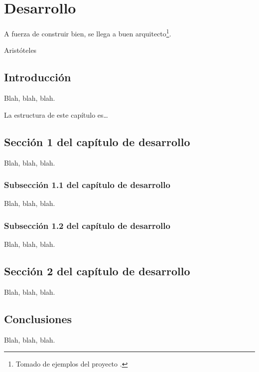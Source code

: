 
\chapter{Desarrollo}
\label{cha:development}


\begin{FraseCelebre}
  \begin{Frase}
    A fuerza de construir bien, se llega a buen
    arquitecto\footnote{Tomado de ejemplos del proyecto \texis{}.}.
  \end{Frase}
  \begin{Fuente}
    Aristóteles
  \end{Fuente}
\end{FraseCelebre}



\section{Introducción}
\label{sec:development-introduction}

Blah, blah, blah.

La estructura de este capítulo es\ldots


\section{Sección 1 del capítulo de desarrollo}
\label{sec:development-1}

Blah, blah, blah.


\subsection{Subsección 1.1 del capítulo de desarrollo}
\label{sec:development-11}

Blah, blah, blah.


\subsection{Subsección 1.2 del capítulo de desarrollo}
\label{sec:development-12}

Blah, blah, blah.



\section{Sección 2 del capítulo de desarrollo}
\label{sec:development-2}

Blah, blah, blah.




\section{Conclusiones}
\label{sec:development-conclusions}

Blah, blah, blah.



